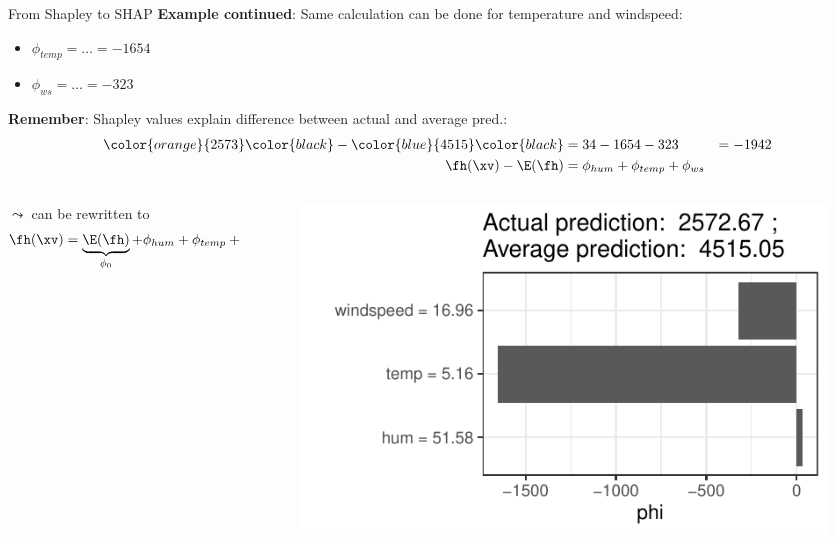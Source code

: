 \documentclass[11pt,compress,t,notes=noshow, aspectratio=169, xcolor=table]{beamer}
\begin{document}
\begin{frame}{From Shapley to SHAP}
\textbf{Example continued}: Same calculation can be done for temperature and windspeed:
\begin{itemize}
    \item $\phi_{temp} = \ldots = -1654$
    \item $\phi_{ws} = \ldots = -323$
\end{itemize}

\textbf{Remember}: Shapley values explain difference between actual and average pred.:
\begin{eqnarray*}
\color{orange}{2573} \color{black}- \color{blue}{4515} \color{black} &= 34 - 1654 - 323 &= - 1942\\
\fh(\xv) - \E(\fh) &= \phi_{hum} + \phi_{temp} + \phi_{ws}&\\
\end{eqnarray*}
\begin{columns}[T]
\begin{column}{0.5\textwidth}
$\leadsto$ can be rewritten to
$$
\fh(\xv) = \underbrace{\E(\fh)}_{\phi_0} + \phi_{hum} + \phi_{temp} + \phi_{ws}
$$
\end{column}
\begin{column}{0.5\textwidth}
\vspace{-1cm}
\begin{figure}
    \centering
    \includegraphics[width=0.9\columnwidth]{figure/shapley2shap.pdf}
\end{figure}
\end{column}
\end{columns}
\end{frame}
\end{document}
